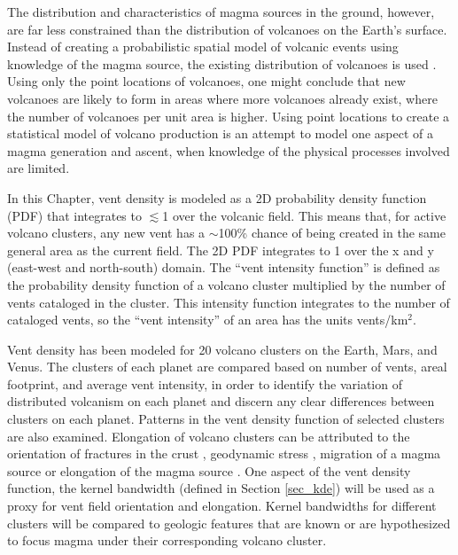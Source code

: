The distribution and characteristics of magma sources in the ground, however, are far less constrained than the distribution of volcanoes on the Earth's surface. Instead of creating a probabilistic spatial model of volcanic events using knowledge of the magma source, the existing distribution of volcanoes is used \citep{connor2015probabilistic,germa2013tectonic}. Using only the point locations of volcanoes, one might conclude that new volcanoes are likely to form in areas where more volcanoes already exist, where the number of volcanoes per unit area is higher. Using point locations to create a statistical model of volcano production is an attempt to model one aspect of a magma generation and ascent, when knowledge of the physical processes involved are limited.

In this Chapter, vent density is modeled as a 2D probability density function (PDF) that integrates to $\lesssim$1 over the volcanic field. This means that, for active volcano clusters, any new vent has a $\sim$100\% chance of being created in the same general area as the current field. The 2D PDF integrates to 1 over the x and y (east-west and north-south) domain. The ``vent intensity function'' is defined as the probability density function of a volcano cluster multiplied by the number of vents cataloged in the cluster. This intensity function integrates to the number of cataloged vents, so the ``vent intensity'' of an area has the units vents/km$^2$.

Vent density has been modeled for 20 volcano clusters on the Earth, Mars, and Venus. The clusters of each planet are compared based on number of vents, areal footprint, and average vent intensity, in order to identify the variation of distributed volcanism on each planet and discern any clear differences between clusters on each planet. Patterns in the vent density function of selected clusters are also examined. Elongation of volcano clusters can be attributed to the orientation of fractures in the crust \citep{delaney1986field}, geodynamic stress \citep{germa2013tectonic}, migration of a magma source \citep{richardson2013volcanic, tanaka1986migration} or elongation of the magma source \citep{tamura2002hot}. One aspect of the vent density function, the kernel bandwidth (defined in Section \ref{sec_kde}) will be used as a proxy for vent field orientation and elongation. Kernel bandwidths for different clusters will be compared to geologic features that are known or are hypothesized to focus magma under their corresponding volcano cluster.

